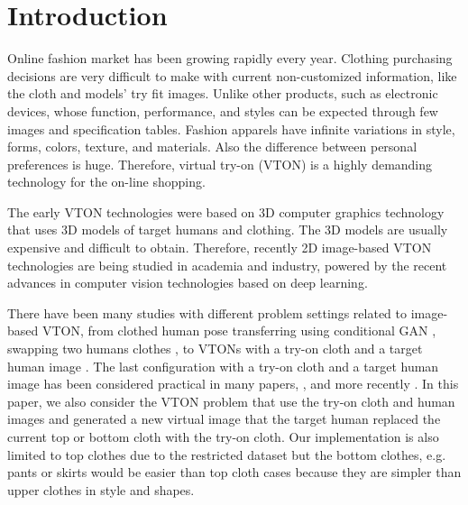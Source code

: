 
\section{Introduction}

Online fashion market has been growing rapidly every year. Clothing purchasing decisions are very difficult to make with current non-customized information, like the cloth and models' try fit images. Unlike other products, such as electronic devices, whose function, performance, and styles can be expected through few images and specification tables. Fashion apparels have infinite variations in style, forms, colors, texture, and materials.  Also the difference between personal preferences is huge. Therefore, virtual try-on (VTON) is a highly demanding technology for the on-line shopping. 

The early VTON technologies were based on 3D computer graphics technology that uses 3D models of target humans and clothing. The 3D models are usually expensive and difficult to obtain. Therefore, recently 2D image-based VTON technologies are being studied in academia and industry, powered by the recent advances in computer vision technologies based on deep learning. 

There have been many studies with different problem settings related to image-based VTON, from clothed human pose transferring using conditional GAN \cite{ma2017pose}, swapping two humans clothes \cite{jetchev2017conditional}, to VTONs with a try-on cloth and a target human image \cite{Han2017VITONAI}. The last configuration with a try-on cloth and a target human image has been considered practical in many papers, \cite{Han2017VITONAI,Wang2018TowardCI}, and more recently \cite{Sun2019ImageBasedVT,Yu_2019_ICCV,jae2019viton}. 
In this paper, we also consider the VTON problem that use the try-on cloth and human images and generated a new virtual image that the target human replaced the current top or bottom cloth with the try-on cloth. Our implementation is also limited to top clothes due to the restricted dataset but the bottom clothes, e.g. pants or skirts would be easier than top cloth cases because they are simpler than upper clothes in style and shapes.

